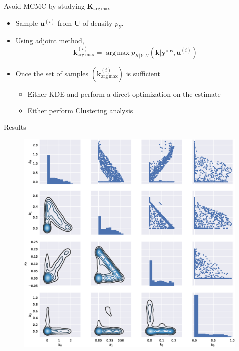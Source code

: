 \documentclass{beamer}
\newlength{\thirdcolwid}
\DeclareMathOperator*{\argmax}{arg\,max}
\newcommand{\yobs}{\bm{y}^{\mathrm{obs}}}
\begin{document}
\begin{frame}[t]
\begin{columns}[t]
\begin{column}{\thirdcolwid}
\begin{block}{Avoid MCMC by studying $\bm{K}_{\argmax}$}
  \begin{itemize}
  \item Sample $\bm{u}^{(i)}$ from $\bm{U}$ of density $p_U$.
  \item Using adjoint method, 
    \begin{equation*}
      \bm{k}_{\argmax}^{(i)} = \argmax p_{K|Y,U}(\bm{k}|\yobs, \bm{u}^{(i)})
    \end{equation*}
  \item Once the set of samples $(\bm{k}_{\argmax}^{(i)})$ is sufficient
    \begin{itemize}
    \item Either KDE and perform a direct optimization on the estimate
    \item Either perform Clustering analysis
    \end{itemize}
  \end{itemize}
\end{block}


\begin{block}{Results}

\begin{figure}
\includegraphics[width=0.8\linewidth]{pair_plot_4d_centered}
\end{figure}


\end{block}
\end{column}
\end{columns}
\end{frame}
\end{document}
